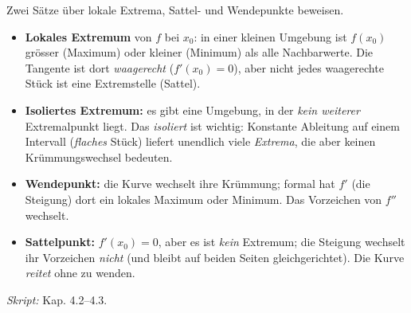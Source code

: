 

Zwei Sätze über lokale Extrema, Sattel- und Wendepunkte beweisen.

\begin{werkzeugkasten}
\begin{itemize}
  \item \textbf{Lokales Extremum} von $f$ bei $x_0$: in einer kleinen
        Umgebung ist $f(x_0)$ grösser (Maximum) oder kleiner (Minimum) als
        alle Nachbarwerte. Die Tangente ist dort \emph{waagerecht}
        ($f'(x_0)=0$), aber nicht jedes waagerechte Stück ist eine
        Extremstelle (Sattel).
  \item \textbf{Isoliertes Extremum:} es gibt eine Umgebung, in der
        \emph{kein weiterer} Extremalpunkt liegt. Das \emph{isoliert} ist
        wichtig: Konstante Ableitung auf einem Intervall (\emph{flaches}
        Stück) liefert unendlich viele \emph{Extrema}, die aber keinen
        Krümmungswechsel bedeuten.
  \item \textbf{Wendepunkt:} die Kurve wechselt ihre Krümmung; formal hat
        $f'$ (die Steigung) dort ein lokales Maximum oder Minimum. Das
        Vorzeichen von $f''$ wechselt.
  \item \textbf{Sattelpunkt:} $f'(x_0)=0$, aber es ist \emph{kein}
        Extremum; die Steigung wechselt ihr Vorzeichen \emph{nicht} (und
        bleibt auf beiden Seiten gleichgerichtet). Die Kurve \emph{reitet}
        ohne zu wenden.
\end{itemize}
\textit{Skript:} Kap. 4.2--4.3.
\end{werkzeugkasten}

